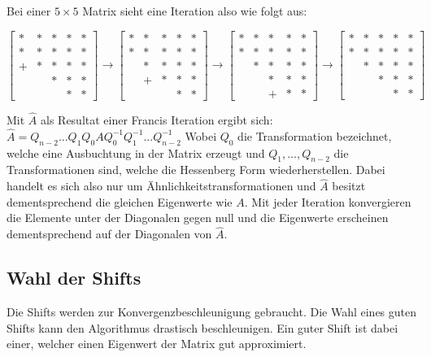 Bei einer $5 \times 5$ Matrix sieht eine Iteration also wie folgt aus:

\begin{equation}
	\begin{bmatrix}
	* & * & * & * & *  \\
	* & * & *  & * & *  \\
	+ & * & * & * & *\\
	&   & * & * & * \\
	&   &   & * & * 
	\end{bmatrix} \rightarrow
	\begin{bmatrix}
	* & * & * & * & *  \\
	* & * & *  & * & *  \\
	& * & * & * & *\\
	&  + & * & * & * \\
	&   &   & * & * 
	\end{bmatrix} \rightarrow
	\begin{bmatrix}
	* & * & * & * & *  \\
	* & * & *  & * & *  \\
	& * & * & * & *\\
	&   & * & * & * \\
	&   &  + & * & * 
	\end{bmatrix} \rightarrow
	\begin{bmatrix}
	* & * & * & * & *  \\
	* & * & *  & * & *  \\
	& * & * & * & *\\
	&   & * & * & * \\
	&   &   & * & * 
	\end{bmatrix}
\end{equation}

Mit $\hat{A}$ als Resultat einer Francis Iteration ergibt sich: $\hat{A}=Q_{n-2}...Q_{1}Q_{0}AQ_{0}^{-1}Q_{1}^{-1}...Q_{n-2}^{-1}$
Wobei $Q_{0}$ die Transformation bezeichnet, welche eine Ausbuchtung in der Matrix erzeugt und $Q_{1},...,Q_{n-2}$ die Transformationen sind, welche die Hessenberg Form wiederherstellen.
Dabei handelt es sich also nur um Ähnlichkeitstransformationen und $\hat{A}$ besitzt dementsprechend die gleichen Eigenwerte wie $A$.
Mit jeder Iteration konvergieren die Elemente unter der Diagonalen gegen null und die Eigenwerte erscheinen dementsprechend auf der Diagonalen von $\hat{A}$.

\subsection{Wahl der Shifts\label{francis:section:francis_iteration:wahl_shift}}
Die Shifts werden zur Konvergenzbeschleunigung gebraucht.
Die Wahl eines guten Shifts kann den Algorithmus drastisch beschleunigen. 
Ein guter Shift ist dabei einer, welcher einen Eigenwert der Matrix gut approximiert.

